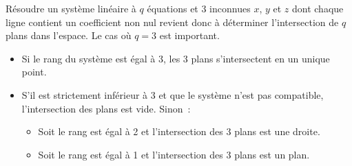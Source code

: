\documentclass{magnoliaold}
\begin{document}
Résoudre un système linéaire à $q$ équations et 3 inconnues $x$, $y$ et 
$z$ dont chaque ligne contient un coefficient non nul revient donc à déterminer l'intersection de $q$ plans dans l'espace. Le cas où $q=3$ est important.
\begin{itemize}
\item Si le rang du système est égal à 3, les 3 plans s'intersectent en un unique point.
\item S'il est strictement inférieur à 3 et que le système n'est pas compatible, l'intersection des plans est vide. Sinon~:
\begin{itemize}
\item Soit le rang est égal à 2 et l'intersection des 3 plans est une droite.
\item Soit le rang est égal à 1 et l'intersection des 3 plans est un plan.
\end{itemize} 
\end{itemize}


\end{document}
